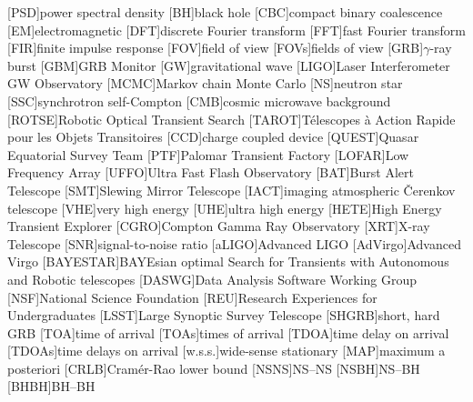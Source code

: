 \usepackage{acronym}

[PSD]{power spectral density}
[BH]{black hole}
[CBC]{compact binary coalescence}
[EM]{electromagnetic}
[DFT]{discrete Fourier transform}
[FFT]{fast Fourier transform}
[FIR]{finite impulse response}
[FOV]{field of view}
[FOVs]{fields of view}
[GRB]{$\gamma$\nobreakdashes-ray burst}
[GBM]{\acl{GRB} Monitor}
[GW]{gravitational wave}
[LIGO]{Laser Interferometer \acs{GW} Observatory}
[MCMC]{Markov chain Monte Carlo}
[NS]{neutron star}
[SSC]{synchrotron self\nobreakdashes-Compton}
[CMB]{cosmic microwave background}
[ROTSE]{Robotic Optical Transient Search}
[TAROT]{T\'{e}lescopes \`{a} Action Rapide pour les Objets Transitoires}
[CCD]{charge coupled device}
[QUEST]{Quasar Equatorial Survey Team}
[PTF]{Palomar Transient Factory}
[LOFAR]{Low Frequency Array}
[UFFO]{Ultra Fast Flash Observatory}
[BAT]{Burst Alert Telescope}
[SMT]{Slewing Mirror Telescope}
[IACT]{imaging atmospheric \v{C}erenkov telescope}
[VHE]{very high energy}
[UHE]{ultra high energy}
[HETE]{High Energy Transient Explorer}
[CGRO]{Compton Gamma Ray Observatory}
[XRT]{X\nobreakdashes-ray Telescope}
[SNR]{signal\nobreakdashes-to\nobreakdashes-noise ratio}
[aLIGO]{Advanced \acs{LIGO}}
[AdVirgo]{Advanced Virgo}
[BAYESTAR]{BAYEsian optimal Search for Transients with Autonomous and Robotic telescopes}
[DASWG]{Data Analysis Software Working Group}
[NSF]{National Science Foundation}
[REU]{Research Experiences for Undergraduates}
[LSST]{Large Synoptic Survey Telescope}
[SHGRB]{short, hard \acl{GRB}}
[TOA]{time of arrival}
[TOAs]{times of arrival}
[TDOA]{time delay on arrival}
[TDOAs]{time delays on arrival}
[w.s.s.]{wide\nobreakdashes-sense stationary}
[MAP]{maximum a posteriori}
[CRLB]{Cram\'{e}r-Rao lower bound}
[NSNS]{\acl{NS}\nobreakdashes--\acl{NS}}
[NSBH]{\acl{NS}\nobreakdashes--\acl{BH}}
[BHBH]{\acl{BH}\nobreakdashes--\acl{BH}}
